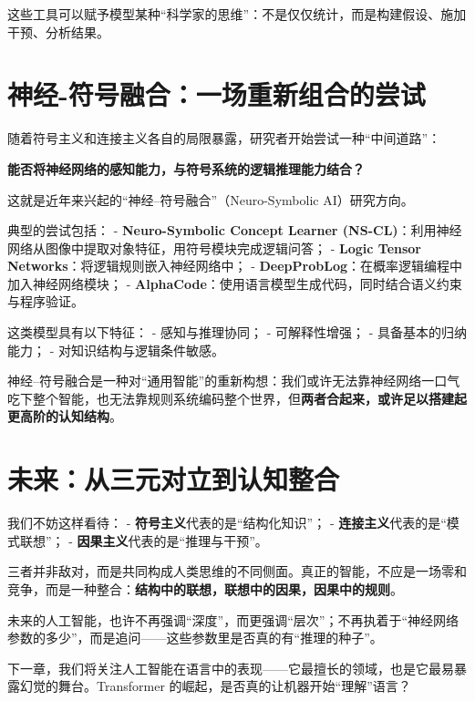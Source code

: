 这些工具可以赋予模型某种“科学家的思维”：不是仅仅统计，而是构建假设、施加干预、分析结果。

\section*{神经-符号融合：一场重新组合的尝试}

随着符号主义和连接主义各自的局限暴露，研究者开始尝试一种“中间道路”：

\textbf{能否将神经网络的感知能力，与符号系统的逻辑推理能力结合？}

这就是近年来兴起的“神经–符号融合”（Neuro-Symbolic AI）研究方向。

典型的尝试包括：
- \textbf{Neuro-Symbolic Concept Learner (NS-CL)}：利用神经网络从图像中提取对象特征，用符号模块完成逻辑问答；
- \textbf{Logic Tensor Networks}：将逻辑规则嵌入神经网络中；
- \textbf{DeepProbLog}：在概率逻辑编程中加入神经网络模块；
- \textbf{AlphaCode}：使用语言模型生成代码，同时结合语义约束与程序验证。

这类模型具有以下特征：
- 感知与推理协同；
- 可解释性增强；
- 具备基本的归纳能力；
- 对知识结构与逻辑条件敏感。

神经–符号融合是一种对“通用智能”的重新构想：我们或许无法靠神经网络一口气吃下整个智能，也无法靠规则系统编码整个世界，但\textbf{两者合起来，或许足以搭建起更高阶的认知结构}。

\section*{未来：从三元对立到认知整合}

我们不妨这样看待：
- \textbf{符号主义}代表的是“结构化知识”；
- \textbf{连接主义}代表的是“模式联想”；
- \textbf{因果主义}代表的是“推理与干预”。

三者并非敌对，而是共同构成人类思维的不同侧面。真正的智能，不应是一场零和竞争，而是一种整合：\textbf{结构中的联想，联想中的因果，因果中的规则}。

未来的人工智能，也许不再强调“深度”，而更强调“层次”；不再执着于“神经网络参数的多少”，而是追问——这些参数里是否真的有“推理的种子”。

下一章，我们将关注人工智能在语言中的表现——它最擅长的领域，也是它最易暴露幻觉的舞台。Transformer 的崛起，是否真的让机器开始“理解”语言？

\nocite{*}
\printbibliography[heading=bibintoc, title=\ebibname]
\appendix

\newpage
